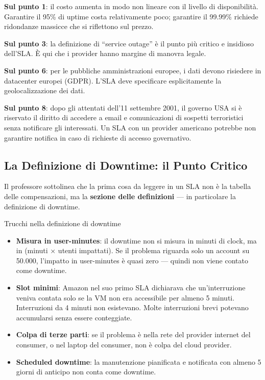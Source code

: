 \documentclass[
  italian,
  openany]{book}
\providecommand{\tightlist}{%
  \setlength{\itemsep}{0pt}\setlength{\parskip}{0pt}}
\begin{document}
\textbf{Sul punto 1}: il costo aumenta in modo non lineare con il
livello di disponibilità. Garantire il 95\% di uptime costa
relativamente poco; garantire il 99.99\% richiede ridondanze massicce
che si riflettono sul prezzo.

\textbf{Sul punto 3}: la definizione di ``service outage'' è il punto
più critico e insidioso dell'SLA. È qui che i provider hanno margine di
manovra legale.

\textbf{Sul punto 6}: per le pubbliche amministrazioni europee, i dati
devono risiedere in datacenter europei (GDPR). L'SLA deve specificare
esplicitamente la geolocalizzazione dei dati.

\textbf{Sul punto 8}: dopo gli attentati dell'11 settembre 2001, il
governo USA si è riservato il diritto di accedere a email e
comunicazioni di sospetti terroristici senza notificare gli interessati.
Un SLA con un provider americano potrebbe non garantire notifica in caso
di richieste di accesso governativo.

\subsection{La Definizione di Downtime: il Punto
Critico}\label{la-definizione-di-downtime-il-punto-critico}

Il professore sottolinea che la prima cosa da leggere in un SLA non è la
tabella delle compensazioni, ma la \textbf{sezione delle definizioni}
--- in particolare la definizione di downtime.

\begin{calloutwarning}{Trucchi nella definizione di downtime}

\begin{itemize}
\tightlist
\item
  \textbf{Misura in user-minutes}: il downtime non si misura in minuti
  di clock, ma in (minuti × utenti impattati). Se il problema riguarda
  solo un account su 50.000, l'impatto in user-minutes è quasi zero ---
  quindi non viene contato come downtime.
\item
  \textbf{Slot minimi}: Amazon nel suo primo SLA dichiarava che
  un'interruzione veniva contata solo se la VM non era accessibile per
  almeno 5 minuti. Interruzioni da 4 minuti non esistevano. Molte
  interruzioni brevi potevano accumularsi senza essere conteggiate.
\item
  \textbf{Colpa di terze parti}: se il problema è nella rete del
  provider internet del consumer, o nel laptop del consumer, non è colpa
  del cloud provider.
\item
  \textbf{Scheduled downtime}: la manutenzione pianificata e notificata
  con almeno 5 giorni di anticipo non conta come downtime.
\end{itemize}

\end{calloutwarning}
\end{document}
